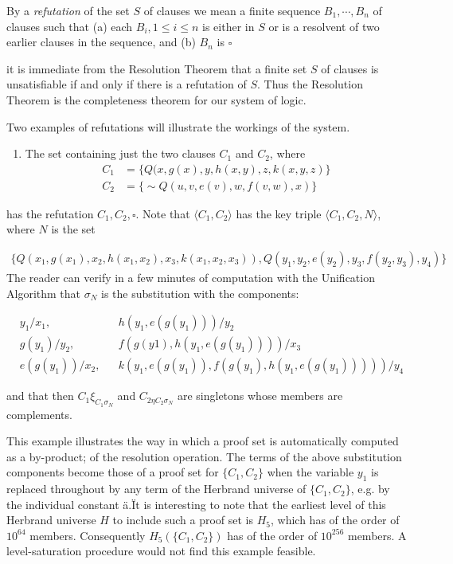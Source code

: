 \documentclass[8pt]{extarticle}
\begin{document}
By a \emph{refutation} of the set $S$ of clauses we mean a finite sequence $B_1,\dotsm,B_n$ of clauses such that (a) each $B_i, 1 \leq i \leq n$ is either in $S$ or is a resolvent of two earlier clauses in the sequence, and (b) $B_n$ is $\square$

it is immediate from the Resolution Theorem that a finite set $S$ of clauses is
unsatisfiable if and only if there is a refutation of $S$. Thus the Resolution Theorem is the completeness theorem for our system of logic. 

Two examples of refutations will illustrate the workings of the system. 

\begin{enumerate}[label=Example \arabic*.]
    \item The set containing just the two clauses $C_1$ and $C_2$, where
        \begin{align*}
            C_1 &= \{Q(x,g(x),y,h(x,y),z,k(x,y,z)\}\\
            C_2 &= \{\sim Q(u,v,e(v),w,f(v,w),x)\}
        \end{align*}
\end{enumerate}
\noindent
has the refutation $C_1, C_2, \square$. Note that $\langle C_1, C_2\rangle$ has the key triple $\langle C_1, C_2, N\rangle$, where $N$ is the set

\begin{align*}
    \{Q(x_1,g(x_1),x_2,h(x_1,x_2),x_3,k(x_1,x_2,x_3)),
    Q(y_1,y_2,e(y_2),y_3,f(y_2,y_3),y_4)\}
\end{align*}
\noindent
The reader can verify in a few minutes of computation with the Unification
Algorithm that $\sigma_N$ is the substitution with the components: 

\begin{align*}
    & y_1/x_1,       &&  h(y_1,e(g(y_1)))/y_2\\
    & g(y_1)/y_2,    &&  f(g(y1), h(y_1, e(g(y_1))))/x_3\\
    & e(g(y_1))/x_2, &&  k(y_1, e(g(y_1)), f(g(y_1), h(y_1, e(g(y_1)))))/y_4
\end{align*}

\noindent
and that then $C_1\xi_{C_1\sigma_N}$ and $C_{2\eta C_2\sigma_N}$ are singletons whose members are complements.

This example illustrates the way in which a proof set is automatically computed as a by-product; of the resolution operation. The terms of the above substitution components become those of a proof set for $\{C_1 , C_2\}$ when the variable $y_1$ is replaced throughout by any term of the Herbrand universe of $\{C_1, C_2\}$, e.g. by the individual constant \"a.\" It is interesting to note that the earliest level of this Herbrand universe $H$ to include such a proof set is $H_5$, which has of the order of $10^64$ members. Consequently $H_5(\{C_1, C_2\})$ has of the order of $10^256$ members. A level-saturation procedure would not find this example feasible.
\end{document}
